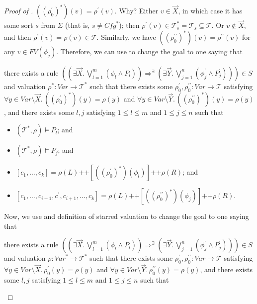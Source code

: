\documentclass{article}
\newenvironment{proofenv}
  {
    \VerbatimEnvironment\begin{tcolorbox}[colback=black!0!white] %
  }
  {
   \end{tcolorbox}
  }
\begin{document}
\begin{proof}[Proof of ]
$((\rho_0^\prime)^*)(v) = \rho^\prime(v)$.
Why? Either $v \in \vec{X}$, in which case it has some sort $s$ from $\Sigma$
(that is, $s \not = \mathit{Cfg}^*$);
then $\rho^\prime(v) \in \mathcal{T}^*_s = \mathcal{T}_s \subseteq \mathcal{T}$.
Or $v \not\in \vec{X}$, and then $\rho^\prime(v) = \rho(v) \in \mathcal{T}$.
Similarly, we have
$((\rho_0^{\prime\prime})^*)(v) = \rho^{\prime\prime}(v)$
for any $v \in \mathit{FV}(\phi_j)$.
Therefore, we can use  to change the goal to one saying that
\begin{proofenv}
there exists a rule $((\exists \vec{X}.\, \bigvee_{l=1}^{m} (\phi_l \land P_l)) \Rightarrow^\exists (\exists \vec{Y}.\, \bigvee_{j=1}^{n} (\phi^\prime_j \land P^\prime_j))) \in S$
and valuation $\rho^* : \mathit{Var} \to \mathcal{T}^*$ such that
there exists some $\rho_0^\prime,\rho_0^{\prime\prime} : \mathit{Var} \to \mathcal{T}$
satisfying $\forall y \in \mathit{Var} \setminus \vec{X}.\, ((\rho_0^\prime)^*)(y) = \rho(y)$
and $\forall y \in \mathit{Var} \setminus \vec{Y}.\, ((\rho_0^{\prime\prime})^*)(y) = \rho(y)$,
and there exists some $l,j$ satisfying $1 \leq l \leq m$ and $1 \leq j \leq n$ such that
\begin{itemize}
    \item $(\mathcal{T}^*, \rho) \vDash P_l$; and
    \item $(\mathcal{T}^*, \rho) \vDash P_j$; and
    \item $[c_1,\ldots,c_k] = \rho(L) \texttt{++} [((\rho_0^\prime)^*)(\phi_l)] \texttt{++} \rho(R)$; and
    \item $[c_1, \ldots, c_{i-1}, c^\prime, c_{i+1}, \ldots, c_k] = \rho(L)
    \texttt{++} [((\rho_0^{\prime\prime})^*)(\phi_j)] 
    \texttt{++} \rho(R)$.
\end{itemize}
\end{proofenv}
Now, we use  and definition of starred valuation to change the goal to one saying that
\begin{proofenv}
there exists a rule $((\exists \vec{X}.\, \bigvee_{l=1}^{m} (\phi_l \land P_l)) \Rightarrow^\exists (\exists \vec{Y}.\, \bigvee_{j=1}^{n} (\phi^\prime_j \land P^\prime_j))) \in S$
and valuation $\rho : \mathit{Var}^* \to \mathcal{T}^*$ such that
there exists some $\rho_0^\prime,\rho_0^{\prime\prime} : \mathit{Var} \to \mathcal{T}$
satisfying $\forall y \in \mathit{Var} \setminus \vec{X}.\, \rho_0^\prime(y) = \rho(y)$
and $\forall y \in \mathit{Var} \setminus \vec{Y}.\, \rho_0^{\prime\prime}(y) = \rho(y)$,
and there exists some $l,j$ satisfying $1 \leq l \leq m$ and $1 \leq j \leq n$ such that

\end{proofenv}
\end{proof}
\end{document}
